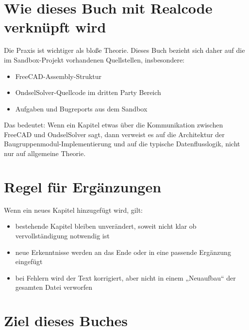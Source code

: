 \documentclass[
  12pt
]{book}
\providecommand{\tightlist}{%
  \setlength{\itemsep}{0pt}\setlength{\parskip}{0pt}}
\begin{document}
\hypertarget{wie-dieses-buch-mit-realcode-verknuxfcpft-wird}{%
\section*{Wie dieses Buch mit Realcode verknüpft
wird}\label{wie-dieses-buch-mit-realcode-verknuxfcpft-wird}}

Die Praxis ist wichtiger als bloße Theorie. Dieses Buch bezieht sich
daher auf die im Sandbox-Projekt vorhandenen Quellstellen, insbesondere:

\begin{itemize}
\tightlist
\item
  FreeCAD-Assembly-Struktur
\item
  OndselSolver-Quellcode im dritten Party Bereich
\item
  Aufgaben und Bugreports aus dem Sandbox
\end{itemize}

Das bedeutet: Wenn ein Kapitel etwas über die Kommunikation zwischen
FreeCAD und OndselSolver sagt, dann verweist es auf die Architektur der
Baugruppenmodul-Implementierung und auf die typische Datenflusslogik,
nicht nur auf allgemeine Theorie.

\hypertarget{regel-fuxfcr-erguxe4nzungen}{%
\section*{Regel für Ergänzungen}\label{regel-fuxfcr-erguxe4nzungen}}

Wenn ein neues Kapitel hinzugefügt wird, gilt:

\begin{itemize}
\tightlist
\item
  bestehende Kapitel bleiben unverändert, soweit nicht klar ob
  vervollständigung notwendig ist
\item
  neue Erkenntnisse werden an das Ende oder in eine passende Ergänzung
  eingefügt
\item
  bei Fehlern wird der Text korrigiert, aber nicht in einem „Neuaufbau``
  der gesamten Datei verworfen
\end{itemize}

\hypertarget{ziel-dieses-buches}{%
\section*{Ziel dieses Buches}\label{ziel-dieses-buches}}
\end{document}

